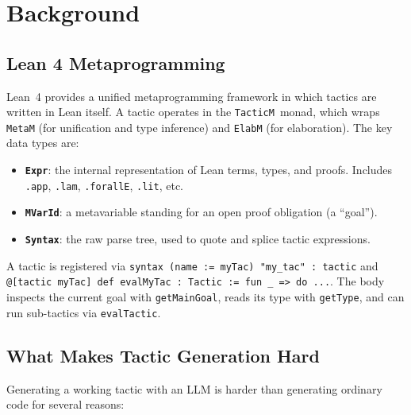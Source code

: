 \documentclass{llncs}
\begin{document}
\section{Background}

\subsection{Lean 4 Metaprogramming}

Lean~4 provides a unified metaprogramming framework in which tactics are
written in Lean itself.  A tactic operates in the \texttt{TacticM}~monad, which
wraps \texttt{MetaM} (for unification and type inference) and
\texttt{ElabM} (for elaboration).  The key data types are:

\begin{itemize}
  \item \textbf{\texttt{Expr}}: the internal representation of Lean terms,
        types, and proofs.  Includes \texttt{.app}, \texttt{.lam},
        \texttt{.forallE}, \texttt{.lit}, etc.
  \item \textbf{\texttt{MVarId}}: a metavariable standing for an open proof
        obligation (a ``goal'').
  \item \textbf{\texttt{Syntax}}: the raw parse tree, used to quote and
        splice tactic expressions.
\end{itemize}

A tactic is registered via
\lstinline{syntax (name := myTac) "my_tac" : tactic} and
\lstinline{@[tactic myTac] def evalMyTac : Tactic := fun _ => do ...}.
The body inspects the current goal with \texttt{getMainGoal},
reads its type with \texttt{getType},
and can run sub-tactics via \texttt{evalTactic}.

\subsection{What Makes Tactic Generation Hard}

Generating a working tactic with an LLM is harder than generating ordinary
code for several reasons:
\end{document}
